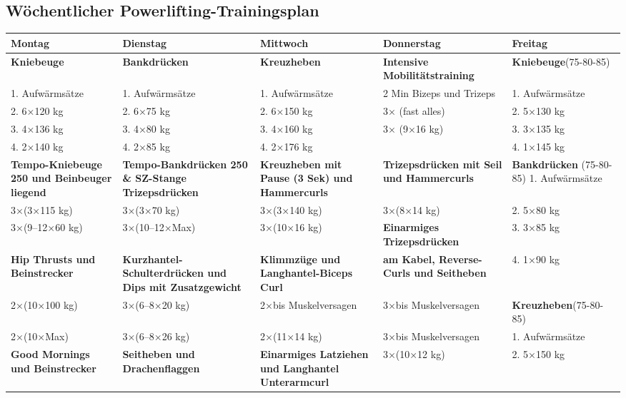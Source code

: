 \documentclass[a4paper,landscape]{article}
\begin{document}
\vspace{10cm}\textit{   }\\\\
\begin{center}
\section*{Wöchentlicher Powerlifting-Trainingsplan}
\begin{adjustbox}{max width=\textwidth}
\begin{tabular}{|p{5cm}|p{5cm}|p{5cm}|p{5cm}|p{5cm}|}
\hline
\textbf{Montag} & \textbf{Dienstag} & \textbf{Mittwoch} & \textbf{Donnerstag} & \textbf{Freitag} \\
\hline
\textbf{Kniebeuge} & \textbf{Bankdrücken} & \textbf{Kreuzheben} & \textbf{Intensive Mobilitätstraining} & \textbf{Kniebeuge}\qquad (75-80-85) \\
1. Aufwärmsätze & 1. Aufwärmsätze & 1. Aufwärmsätze & 2 Min Bizeps und Trizeps & 1. Aufwärmsätze \\
2. 6×120 kg & 2. 6×75 kg & 2. 6×150 kg & 3× (fast alles) & 2. 5×130 kg \\
3. 4×136 kg & 3. 4×80 kg & 3. 4×160 kg & 3× (9×16 kg) & 3. 3×135 kg \\
4. 2×140 kg & 4. 2×85 kg & 4. 2×176 kg & & 4. 1×145 kg \\
\textbf{Tempo-Kniebeuge 250 und Beinbeuger liegend} & \textbf{Tempo-Bankdrücken 250 \& SZ-Stange Trizepsdrücken} & \textbf{Kreuzheben mit Pause (3 Sek) und Hammercurls} & \textbf{Trizepsdrücken mit Seil und Hammercurls} & \textbf{Bankdrücken} \qquad (75-80-85)  1. Aufwärmsätze \\
3×(3×115 kg) & 3×(3×70 kg) & 3×(3×140 kg) & 3×(8×14 kg) & 2. 5×80 kg \\
3×(9–12×60 kg) & 3×(10–12×Max) & 3×(10×16 kg) & \textbf{Einarmiges Trizepsdrücken} & 3. 3×85 kg \\
\textbf{Hip Thrusts und Beinstrecker} & \textbf{Kurzhantel-Schulterdrücken und Dips mit Zusatzgewicht} & \textbf{Klimmzüge und Langhantel-Biceps Curl} & \textbf{am Kabel, Reverse-Curls und Seitheben} & 4. 1×90 kg \\
2×(10×100 kg) & 3×(6–8×20 kg) & 2×bis Muskelversagen & 3×bis Muskelversagen & \textbf{Kreuzheben}\qquad (75-80-85) \\
2×(10×Max) & 3×(6–8×26 kg) & 2×(11×14 kg) & 3×bis Muskelversagen & 1. Aufwärmsätze \\
\textbf{Good Mornings und Beinstrecker} & \textbf{Seitheben und Drachenflaggen} & \textbf{Einarmiges Latziehen und Langhantel Unterarmcurl} & 3×(10×12 kg) & 2. 5×150 kg \\

\end{tabular}
\end{adjustbox}
\end{center}
\end{document}

